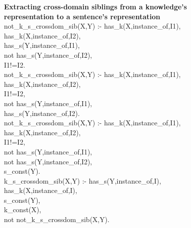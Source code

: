 \textbf{Extracting cross-domain siblings from a knowledge’s\\
representation to a sentence’s representation}\\
not\_k\_s\_crossdom\_sib(X,Y) :- has\_k(X,instance\_of,I1),\\
has\_k(X,instance\_of,I2),\\
has\_s(Y,instance\_of,I1),\\
not has\_s(Y,instance\_of,I2),\\
I1!=I2.\\
not\_k\_s\_crossdom\_sib(X,Y) :- has\_k(X,instance\_of,I1),  \\
has\_k(X,instance\_of,I2),\\
I1!=I2,\\
not has\_s(Y,instance\_of,I1),\\
has\_s(Y,instance\_of,I2).\\
not\_k\_s\_crossdom\_sib(X,Y) :- has\_k(X,instance\_of,I1),\\
has\_k(X,instance\_of,I2),\\
I1!=I2,\\
not has\_s(Y,instance\_of,I1),\\
not has\_s(Y,instance\_of,I2),\\
s\_const(Y).\\
k\_s\_crossdom\_sib(X,Y) :- has\_s(Y,instance\_of,I),\\
has\_k(X,instance\_of,I),\\
s\_const(Y),\\
k\_const(X),\\
not not\_k\_s\_crossdom\_sib(X,Y).\\

